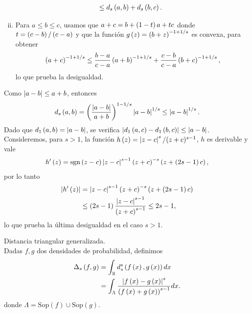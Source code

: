 \begin{dem}
\begin{enumerate}[i)]
\begin{align*}
		& \le d_{s}\left( a,b \right) + d_{s}\left( b,c \right).
		\end{align*}
		\item Para $a \le b \le c$, usamos que $a + c = b + \left( 1-t \right) a + t c$
		donde $t = \left( c-b \right)/\left( c-a \right)$ y que la función $g\left( z \right) = \left( b+z \right)^{-1+1/s}$ es convexa, para obtener
		\begin{align*}
		\left( a+c \right)^{-1+1/s} \le \frac{b-a}{c-a} \left( a+b \right)^{-1+1/s}
		+ \frac{c-b}{c-a} \left( b+c \right)^{-1+1/s},
		\end{align*}
		lo que prueba la desigualdad.
	\end{enumerate}
	Como $\left| a-b \right|\le a+b$, entonces 
	\begin{align*}
	d_{s}\left( a,b \right) = \left( \frac{\left| a-b \right|}{a+b} \right)^{1-1/s} \left| a-b \right|^{1/s} \le \left| a-b \right|^{1/s}.
	\end{align*}
	Dado que $d_{1}\left( a,b \right) = \left| a-b \right|$, se verifica $\left| d_{1}\left( a,c \right)-d_{1}\left( b,c \right) \right| \le \left| a-b \right|$. Consideremos, para $s>1$, la función
	$h\left( z \right) = \left| z-c \right|^{s}/(z+c)^{s-1}$, $h$ es derivable y vale
	\begin{align*}
	h'\pa{z} = %
	\sig{z-c}\abs{z-c}^{s-1} \pa{z+c}^{-s} \pa{z+\pa{2s-1}c},
	\end{align*}
	por lo tanto
	\begin{align*}
	\left| h'\left( z \right) \right| & = \left| z-c \right|^{s-1} \left( z+c \right)^{-s} \left( z+\left( 2s-1 \right)c \right) \\
	& \le \left( 2s-1 \right)\frac{\left| z-c \right|^{s-1}}{\left( z+c \right)^{s-1}} \le 2s - 1,
	\end{align*}
	lo que prueba la última desigualdad en el caso $s>1$.
\end{dem}

\begin{definition} Distancia triangular generalizada.\\
	\label{TriangularGeneralizada}
	Dadas $f,g$ dos densidades de probabilidad, definimos
	\begin{align*}
	\Delta_{s}\left( f,g \right) &= \displaystyle \int_{\mathbb{R}} d_{s}^{s}\left( f\left( x \right),g\left( x \right) \right) dx\\
	                   &= \displaystyle \int_{\Lambda} \dfrac{\left| f\left( x \right) - g\left( x \right) \right|^s}{\left( f\left( x \right) + g\left( x \right) \right)^{s-1}} dx.
	\end{align*}
	donde $\Lambda=\mathrm{Sop}(f) \cup \mathrm{Sop}(g).$
\end{definition}


